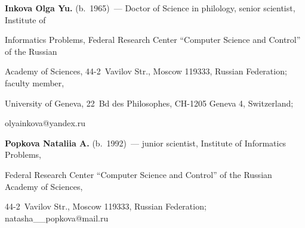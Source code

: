 \vspace*{3pt}





\noindent


\textbf{Inkova Olga Yu.} (b.\ 1965)~--- Doctor of Science in philology, senior scientist, Institute of 


Informatics Problems, Federal Research Center ``Computer Science and Control'' of the Russian 


Academy of Sciences, 44-2~Vavilov Str., Moscow 119333, Russian Federation; faculty member, 


University of Geneva, 22~Bd des Philosophes, CH-1205 Geneva 4, Switzerland; 


\mbox{olyainkova@yandex.ru}





\vspace*{3pt}





\noindent


\textbf{Popkova Nataliia A.} (b.\ 1992)~--- junior scientist, Institute of Informatics Problems, 


Federal Research Center ``Computer Science and Control'' of the Russian Academy of Sciences, 


44-2~Vavilov Str., Moscow 119333, Russian Federation; \mbox{natasha\_\_popkova@mail.ru}





 


\label{end\stat}





\renewcommand{\bibname}{\protect\rm Литература} 


